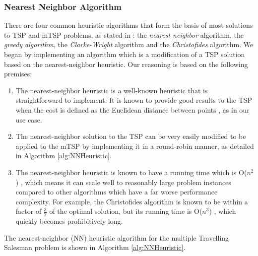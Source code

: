 \subsubsection{Nearest Neighbor Algorithm}
There are four common heuristic algorithms that form the basis of most solutions to TSP and mTSP problems, as stated in \cite{Johnson1997TheOptimization}: the \textit{nearest neighbor} algorithm, the \textit{greedy algorithm}, the \textit{Clarke-Wright} algorithm and the \textit{Christofides} algorithm. We began by implementing an algorithm which is a modification of a TSP solution based on the nearest-neighbor heuristic. Our reasoning is based on the following premises:
\begin{enumerate}
    \item The nearest-neighbor heuristic is a well-known heuristic that is straightforward to implement. It is known to provide good results to the TSP when the cost is defined as the Euclidean distance between points \cite{Johnson1995TheOptimization}, as in our use case.
    \item The nearest-neighbor solution to the TSP can be very easily modified to be applied to the mTSP by implementing it in a round-robin manner, as detailed in Algorithm \ref{alg:NNHeuristic}.
    \item The nearest-neighbor heuristic is known to have a running time which is O($n^2$) \cite{Rosenkrantz1977AnProblem}, which means it can scale well to reasonably large problem instances compared to other algorithms which have a far worse performance complexity. For example, the Christofides algorithm is known to be within a factor of $\frac{3}{2}$ of the optimal solution, but its running time is O($n^3$) \cite{Christofides1976WORST-CASEPROBLEM}, which quickly becomes prohibitively long.
\end{enumerate}

The nearest-neighbor (NN) heuristic algorithm for the multiple Travelling Salesman problem is shown in Algorithm \ref{alg:NNHeuristic}.


